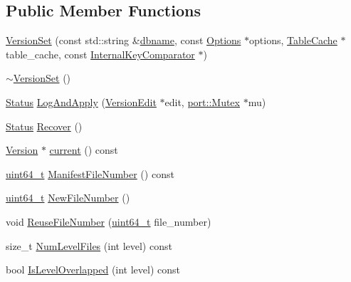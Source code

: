 \subsection*{Public Member Functions}
\begin{DoxyCompactItemize}
\item 
\hyperlink{classleveldb_1_1_version_set_a9e57cec002caced94f5355bb705bd52d}{Version\+Set} (const std\+::string \&\hyperlink{c__test_8c_a75d845559336df6843f3b599960f89d2}{dbname}, const \hyperlink{structleveldb_1_1_options}{Options} $\ast$options, \hyperlink{classleveldb_1_1_table_cache}{Table\+Cache} $\ast$table\+\_\+cache, const \hyperlink{classleveldb_1_1_internal_key_comparator}{Internal\+Key\+Comparator} $\ast$)
\item 
\hyperlink{classleveldb_1_1_version_set_a53a424c5bb7699808193f150e3432e92}{$\sim$\+Version\+Set} ()
\item 
\hyperlink{classleveldb_1_1_status}{Status} \hyperlink{classleveldb_1_1_version_set_af1ce88f08884d9944207a749234699ab}{Log\+And\+Apply} (\hyperlink{classleveldb_1_1_version_edit}{Version\+Edit} $\ast$edit, \hyperlink{classleveldb_1_1port_1_1_mutex}{port\+::\+Mutex} $\ast$mu)
\item 
\hyperlink{classleveldb_1_1_status}{Status} \hyperlink{classleveldb_1_1_version_set_a955ff8620ec56742cdc48da0e74ab40b}{Recover} ()
\item 
\hyperlink{classleveldb_1_1_version}{Version} $\ast$ \hyperlink{classleveldb_1_1_version_set_a500747b987e66c51116287f26cfd028c}{current} () const 
\item 
\hyperlink{stdint_8h_aaa5d1cd013383c889537491c3cfd9aad}{uint64\+\_\+t} \hyperlink{classleveldb_1_1_version_set_a1e0d9925a9d909345ede866b9c504750}{Manifest\+File\+Number} () const 
\item 
\hyperlink{stdint_8h_aaa5d1cd013383c889537491c3cfd9aad}{uint64\+\_\+t} \hyperlink{classleveldb_1_1_version_set_ac4086c848479e74c1d9eb95e250e7167}{New\+File\+Number} ()
\item 
void \hyperlink{classleveldb_1_1_version_set_a8131cebf5be3283e2ce1029e8be0d14e}{Reuse\+File\+Number} (\hyperlink{stdint_8h_aaa5d1cd013383c889537491c3cfd9aad}{uint64\+\_\+t} file\+\_\+number)
\item 
size\+\_\+t \hyperlink{classleveldb_1_1_version_set_aa1d0672d1572382b7ee1ebc5a7266865}{Num\+Level\+Files} (int level) const 
\item 
bool \hyperlink{classleveldb_1_1_version_set_a7462286d2dd343d14f689c9965ddd614}{Is\+Level\+Overlapped} (int level) const 
\item 

\end{DoxyCompactItemize}
